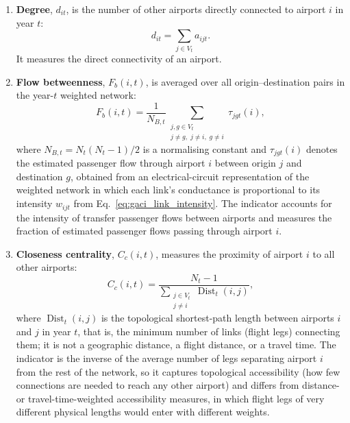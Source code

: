 \begin{enumerate}
    \item \textbf{Degree}, $d_{it}$, is the number of other airports directly connected to airport $i$ in year $t$:
    \begin{equation}
        d_{it} = \sum_{j\in V_t} a_{ijt}.
        \label{eq:gaci_degree}
    \end{equation}
    It measures the direct connectivity of an airport.

    \item \textbf{Flow betweenness}, $F_b(i,t)$, is averaged over all origin--destination pairs in the year-$t$ weighted network:
    \begin{equation}
        F_b(i,t)
        =
        \frac{1}{N_{B,t}}
        \sum_{\substack{
            j,g\in V_t \\
            j\neq g,\; j\neq i,\; g\neq i
        }}
        \tau_{jgt}(i),
        \label{eq:gaci_flow_betweenness}
    \end{equation}
    where $N_{B,t} = N_t(N_t-1)/2$ is a normalising constant and $\tau_{jgt}(i)$ denotes the estimated passenger flow through airport $i$ between origin $j$ and destination $g$, obtained from an electrical-circuit representation of the weighted network in which each link's conductance is proportional to its intensity $w_{ijt}$ from Eq.~\eqref{eq:gaci_link_intensity}. The indicator accounts for the intensity of transfer passenger flows between airports and measures the fraction of estimated passenger flows passing through airport $i$.

    \item \textbf{Closeness centrality}, $C_c(i,t)$, measures the proximity of airport $i$ to all other airports:
    \begin{equation}
        C_c(i,t)
        =
        \frac{N_t-1}
        {\displaystyle
        \sum_{\substack{
            j\in V_t \\
            j\neq i
        }}
        \operatorname{Dist}_t(i,j)},
        \label{eq:gaci_closeness}
    \end{equation}
    where $\operatorname{Dist}_t(i,j)$ is the topological shortest-path length between airports $i$ and $j$ in year $t$, that is, the minimum number of links (flight legs) connecting them; it is not a geographic distance, a flight distance, or a travel time. The indicator is the inverse of the average number of legs separating airport $i$ from the rest of the network, so it captures topological accessibility (how few connections are needed to reach any other airport) and differs from distance- or travel-time-weighted accessibility measures, in which flight legs of very different physical lengths would enter with different weights.


\end{enumerate}
